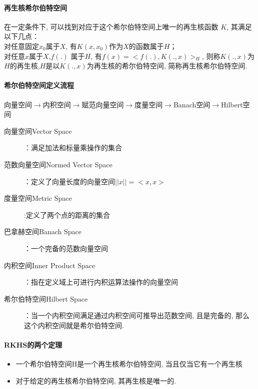\paragraph{再生核希尔伯特空间}
在一定条件下, 可以找到对应于这个希尔伯特空间上唯一的再生核函数 $K$, 其满足以下几点：\\
对任意固定$x_0$属于$X$, 有$K(x,x_0)$作为$X$的函数属于$H$；\\
对任意$x$属于$X$,$f(.)$ 属于$H$, 有$f(x) = {<f(.),K(.,x)>_{H}}$, 则称$K(.,x)$为$H$的再生核,$H$是以$K(.,x)$为再生核的希尔伯特空间, 简称再生核希尔伯特空间. 

\paragraph{希尔伯特空间定义流程}

向量空间$\rightarrow$内积空间$\rightarrow$赋范向量空间$\rightarrow$度量空间$\rightarrow$Banach空间$\rightarrow$Hilbert空间

\begin{description}
    \item[向量空间Vector Space]：满足加法和标量乘操作的集合
    \item[范数向量空间Normed Vector Space]：定义了向量长度的向量空间$\left || x \right || = <x,x>$
    \item[度量空间Metric Space]:定义了两个点的距离的集合
    \item[巴拿赫空间Banach Space]：一个完备的范数向量空间
    \item[内积空间Inner Product Space]：指在定义域上可进行内积运算法操作的向量空间
    \item[希尔伯特空间Hilbert Space]：当一个内积空间满足通过内积空间可推导出范数空间, 且是完备的, 那么这个内积空间就是希尔伯特空间. 

\end{description}
\paragraph{RKHS的两个定理}
\begin{itemize}
    \item 
    一个希尔伯特空间H是一个再生核希尔伯特空间, 当且仅当它有一个再生核
    \item 
    对于给定的再生核希尔伯特空间, 其再生核是唯一的. 
\end{itemize}


